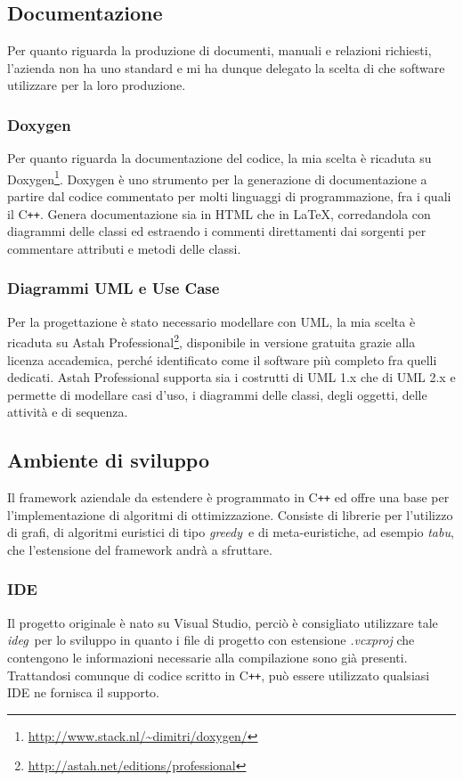     \subsection{Documentazione}
        Per quanto riguarda la produzione di documenti, manuali e relazioni richiesti, l'azienda non ha uno standard e mi ha dunque delegato la scelta di che software utilizzare per la loro produzione. 
        \subsubsection{Doxygen}
        Per quanto riguarda la documentazione del codice, la mia scelta è ricaduta su Doxygen\footnote{{\color{blue} \url{http://www.stack.nl/~dimitri/doxygen/}}}. Doxygen è uno strumento per la generazione di documentazione a partire dal codice commentato per molti linguaggi di programmazione, fra i quali il C\texttt{++}. Genera documentazione sia in HTML che in \LaTeX, corredandola con diagrammi delle classi ed estraendo i commenti direttamenti dai sorgenti per commentare attributi e metodi delle classi.
        \subsubsection{Diagrammi UML e Use Case}
        Per la progettazione è stato necessario modellare con UML, la mia scelta è ricaduta su Astah Professional\footnote{{\color{blue} \url{http://astah.net/editions/professional}}}, disponibile in versione gratuita grazie alla licenza accademica, perché identificato come il software più completo fra quelli dedicati. Astah Professional supporta sia i costrutti di UML 1.x che di UML 2.x e permette di modellare casi d'uso, i diagrammi delle classi, degli oggetti, delle attività e di sequenza.

    \subsection{Ambiente di sviluppo}

Il framework aziendale da estendere è programmato in C\texttt{++} ed offre una base per l'implementazione di algoritmi di ottimizzazione. Consiste di librerie per l'utilizzo di grafi, di algoritmi euristici di tipo \emph{\gls{greedy}}\glsfirstoccur\ e di meta-euristiche, ad esempio \emph{\gls{tabu}}\glsfirstoccur, che l'estensione del framework andrà a sfruttare.

\subsubsection{IDE}
Il progetto originale è nato su Visual Studio, perciò è consigliato utilizzare tale \emph{\gls{ideg}}\glsfirstoccur\  per lo sviluppo in quanto i file di progetto con estensione \textit{.vcxproj} che contengono le informazioni necessarie alla compilazione sono già presenti.\\ Trattandosi comunque di codice scritto in C\texttt{++}, può essere utilizzato qualsiasi IDE ne fornisca il supporto.

